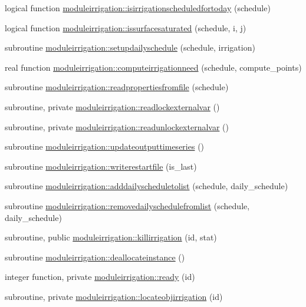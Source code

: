 \begin{DoxyCompactItemize}
\item 
logical function \mbox{\hyperlink{namespacemoduleirrigation_aac246bcb2688c75d66da1daaa6234e3f}{moduleirrigation\+::isirrigationscheduledfortoday}} (schedule)
\item 
logical function \mbox{\hyperlink{namespacemoduleirrigation_aac6fd8245bfb3f2dff30adb8ac0e5d2d}{moduleirrigation\+::issurfacesaturated}} (schedule, i, j)
\item 
subroutine \mbox{\hyperlink{namespacemoduleirrigation_a056efe3e9f80f4703447f224848ebd47}{moduleirrigation\+::setupdailyschedule}} (schedule, irrigation)
\item 
real function \mbox{\hyperlink{namespacemoduleirrigation_ada3092907de79d715950bd53c82fd943}{moduleirrigation\+::computeirrigationneed}} (schedule, compute\+\_\+points)
\item 
subroutine \mbox{\hyperlink{namespacemoduleirrigation_ad1b1ec0e0230931e65e80ed64cb0fa86}{moduleirrigation\+::readpropertiesfromfile}} (schedule)
\item 
subroutine, private \mbox{\hyperlink{namespacemoduleirrigation_a70eefa9249ea662d2b9debe983aee68e}{moduleirrigation\+::readlockexternalvar}} ()
\item 
subroutine, private \mbox{\hyperlink{namespacemoduleirrigation_aec61adf79fc09c9fdc6f2f4a521e6549}{moduleirrigation\+::readunlockexternalvar}} ()
\item 
subroutine \mbox{\hyperlink{namespacemoduleirrigation_af7ed2c0b32e93ac914c21fd4aa075fb6}{moduleirrigation\+::updateoutputtimeseries}} ()
\item 
subroutine \mbox{\hyperlink{namespacemoduleirrigation_ae415b72207ef4095b22ebc9437d78482}{moduleirrigation\+::writerestartfile}} (is\+\_\+last)
\item 
subroutine \mbox{\hyperlink{namespacemoduleirrigation_acc9d2d1967203bbf775af6570c0abd70}{moduleirrigation\+::adddailyscheduletolist}} (schedule, daily\+\_\+schedule)
\item 
subroutine \mbox{\hyperlink{namespacemoduleirrigation_ac485f39127c7b84771cf5b8e2a64e5d7}{moduleirrigation\+::removedailyschedulefromlist}} (schedule, daily\+\_\+schedule)
\item 
subroutine, public \mbox{\hyperlink{namespacemoduleirrigation_acef69ff6504c99d5478be81efeab79fe}{moduleirrigation\+::killirrigation}} (id, stat)
\item 
subroutine \mbox{\hyperlink{namespacemoduleirrigation_a01348df0fa0c9f40c6462d69d05b875b}{moduleirrigation\+::deallocateinstance}} ()
\item 
integer function, private \mbox{\hyperlink{namespacemoduleirrigation_afbdbea5850d2436e5bbe8f9fb8da65bd}{moduleirrigation\+::ready}} (id)
\item 
subroutine, private \mbox{\hyperlink{namespacemoduleirrigation_ae56505ddeb0553538b6cc26774184d2a}{moduleirrigation\+::locateobjirrigation}} (id)
\end{DoxyCompactItemize}
